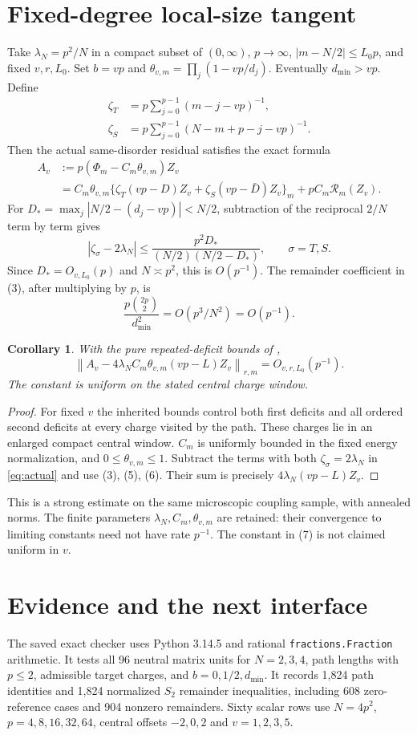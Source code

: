 \documentclass[11pt]{article}
\newcommand{\norm}[1]{\left\lVert#1\right\rVert}
\newtheorem{corollary}{Corollary}
\begin{document}
\section{Fixed-degree local-size tangent}
Take $\lambda_N=p^2/N$ in a compact subset of $(0,\infty)$,
$p\to\infty$, $|m-N/2|\le L_0p$, and fixed $v,r,L_0$.
Set $b=vp$ and $\theta_{v,m}=\prod_j(1-vp/d_j)$.
Eventually $d_{\min}>vp$. Define
\begin{align*}
 \zeta_T&=p\sum_{j=0}^{p-1}(m-j-vp)^{-1},\\
 \zeta_S&=p\sum_{j=0}^{p-1}(N-m+p-j-vp)^{-1}.
\end{align*}
Then the actual same-disorder residual satisfies the exact formula
\begin{align}
 A_v&:=p(\Phi_m-C_m\theta_{v,m})Z_v \nonumber\\
 &=C_m\theta_{v,m}
   \{\zeta_T(vp-D)Z_v+\zeta_S(vp-\bar D)Z_v\}_m
    +pC_m\mathcal R_m(Z_v). \tag{4}\label{eq:actual}
\end{align}
For $D_*=\max_j|N/2-(d_j-vp)|<N/2$, subtraction of the
reciprocal $2/N$ term by term gives
\[
 |\zeta_\sigma-2\lambda_N|
 \le \frac{p^2D_*}{(N/2)(N/2-D_*)},\qquad \sigma=T,S.
 \tag{5}
\]
Since $D_*=O_{v,L_0}(p)$ and $N\asymp p^2$, this is $O(p^{-1})$.
The remainder coefficient in (3), after multiplying by $p$, is
\[
 \frac{p\binom{2p}{2}}{d_{\min}^2}=O(p^3/N^2)=O(p^{-1}).
 \tag{6}
\]
\begin{corollary}
With the pure repeated-deficit bounds of \cite{diagram,operator},
\[
 \boxed{\;
 \norm{A_v-4\lambda_N C_m\theta_{v,m}(vp-L)Z_v}_{r,m}
       =O_{v,r,L_0}(p^{-1}) .\;}
 \tag{7}
\]
The constant is uniform on the stated central charge window.
\end{corollary}
\begin{proof}
For fixed $v$ the inherited bounds control both first deficits and all
ordered second deficits at every charge visited by the path. These
charges lie in an enlarged compact central window. $C_m$ is uniformly
bounded in the fixed energy normalization, and $0\le\theta_{v,m}\le1$.
Subtract the terms with both $\zeta_\sigma=2\lambda_N$ in
\eqref{eq:actual} and use (3), (5), (6). Their sum is precisely
$4\lambda_N(vp-L)Z_v$.
\end{proof}
This is a strong estimate on the same microscopic coupling sample,
with annealed norms. The finite parameters $\lambda_N,C_m,\theta_{v,m}$
are retained: their convergence to limiting constants need not have
rate $p^{-1}$. The constant in (7) is not claimed uniform in $v$.
\newpage
\section{Evidence and the next interface}
The saved exact checker uses Python 3.14.5 and rational
\texttt{fractions.Fraction} arithmetic. It tests all 96 neutral matrix
units for $N=2,3,4$, path lengths with $p\le2$, admissible target charges,
and $b=0,1/2,d_{\min}$. It records 1,824 path identities and 1,824
normalized $S_2$ remainder inequalities, including 608 zero-reference
cases and 904 nonzero remainders. Sixty scalar rows use
$N=4p^2$, $p=4,8,16,32,64$, central offsets $-2,0,2$ and
$v=1,2,3,5$.
\end{document}
